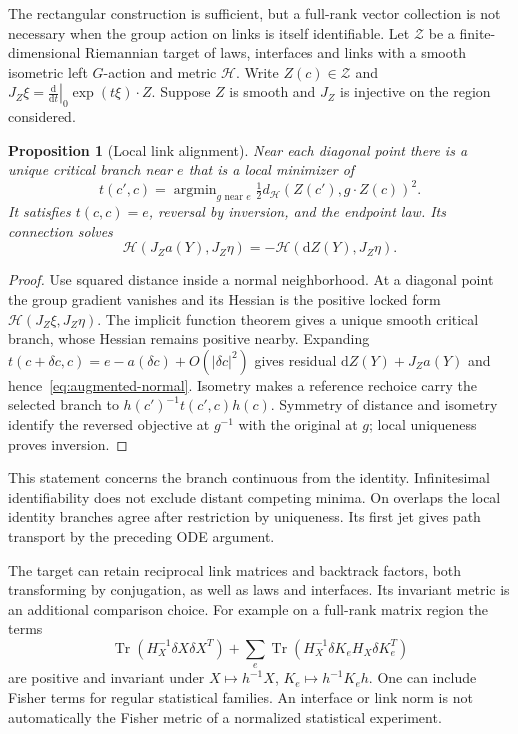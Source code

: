 \documentclass[11pt]{article}
\newtheorem{proposition}[theorem]{Proposition}
\newcommand{\Tr}{\operatorname{Tr}}
\newcommand{\dd}{\mathrm d}
\begin{document}
The rectangular construction is sufficient, but a full-rank vector collection is not necessary when the group action on links is itself identifiable. Let $\mathcal Z$ be a finite-dimensional Riemannian target of laws, interfaces and links with a smooth isometric left $G$-action and metric $\mathcal H$. Write $Z(c)\in\mathcal Z$ and $J_Z\xi=\left.\frac{\dd}{\dd t}\right|_0\exp(t\xi)\cdot Z$. Suppose $Z$ is smooth and $J_Z$ is injective on the region considered.

\begin{proposition}[Local link alignment]
Near each diagonal point there is a unique critical branch near $e$ that is a local minimizer of
\begin{equation}
 t(c',c)=\mathop{\operatorname{argmin}}_{g\text{ near }e}
       \tfrac12 d_{\mathcal H}(Z(c'),g\cdot Z(c))^2.
 \label{eq:alignment}
\end{equation}
It satisfies $t(c,c)=e$, reversal by inversion, and the endpoint law. Its connection solves
\begin{equation}
 \mathcal H(J_Za(Y),J_Z\eta)=-\mathcal H(\dd Z(Y),J_Z\eta).
 \label{eq:augmented-normal}
\end{equation}
\end{proposition}
\begin{proof}
Use squared distance inside a normal neighborhood. At a diagonal point the group gradient vanishes and its Hessian is the positive locked form $\mathcal H(J_Z\xi,J_Z\eta)$. The implicit function theorem gives a unique smooth critical branch, whose Hessian remains positive nearby. Expanding $t(c+\delta c,c)=e-a(\delta c)+O(|\delta c|^2)$ gives residual $\dd Z(Y)+J_Za(Y)$ and hence~\eqref{eq:augmented-normal}. Isometry makes a reference rechoice carry the selected branch to $h(c')^{-1}t(c',c)h(c)$. Symmetry of distance and isometry identify the reversed objective at $g^{-1}$ with the original at $g$; local uniqueness proves inversion.
\end{proof}

This statement concerns the branch continuous from the identity. Infinitesimal identifiability does not exclude distant competing minima. On overlaps the local identity branches agree after restriction by uniqueness. Its first jet gives path transport by the preceding ODE argument.

The target can retain reciprocal link matrices and backtrack factors, both transforming by conjugation, as well as laws and interfaces. Its invariant metric is an additional comparison choice. For example on a full-rank matrix region the terms
\begin{equation}
 \Tr(H_X^{-1}\delta X\delta X^T)
 +\sum_e\Tr(H_X^{-1}\delta K_e H_X\delta K_e^T)
\end{equation}
are positive and invariant under $X\mapsto h^{-1}X$, $K_e\mapsto h^{-1}K_eh$. One can include Fisher terms for regular statistical families. An interface or link norm is not automatically the Fisher metric of a normalized statistical experiment.
\end{document}
